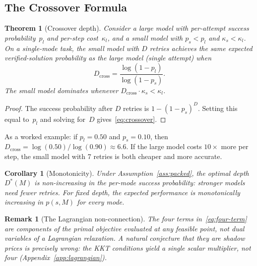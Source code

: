 \documentclass[11pt]{article}
\newtheorem{theorem}{Theorem}
\newtheorem{proof}{Proof}
\newtheorem{corollary}{Corollary}
\newtheorem{remark}{Remark}
\begin{document}
\subsection{The Crossover Formula}
\label{sec:crossover}

\begin{theorem}[Crossover depth]
\label{thm:crossover}
Consider a large model with per-attempt success probability~$p_l$ and
per-step cost~$\kappa_l$, and a small model with $p_s < p_l$ and
$\kappa_s < \kappa_l$.
On a single-mode task, the small model with $D$ retries achieves the
same expected verified-solution probability as the large model (single
attempt) when
\begin{equation}
\label{eq:crossover}
  D_{\mathrm{cross}} = \frac{\log(1 - p_l)}{\log(1 - p_s)}.
\end{equation}
The small model dominates whenever $D_{\mathrm{cross}} \cdot \kappa_s < \kappa_l$.
\end{theorem}

\begin{proof}
The success probability after $D$ retries is $1 - (1-p_s)^D$.
Setting this equal to~$p_l$ and solving for~$D$ gives~\eqref{eq:crossover}.
\end{proof}

As a worked example: if $p_l = 0.50$ and $p_s = 0.10$, then
$D_{\mathrm{cross}} = \log(0.50)/\log(0.90) \approx 6.6$.
If the large model costs $10\times$ more per step, the small model
with 7 retries is both cheaper and more accurate.

\begin{corollary}[Monotonicity]
\label{cor:monotonicity}
Under Assumption~\ref{ass:packed}, the optimal depth $D^*(M)$ is
non-increasing in the per-mode success probability: stronger models need
fewer retries.  For fixed depth, the expected performance is monotonically
increasing in $p(s,M)$ for every mode.
\end{corollary}

\begin{remark}[The Lagrangian non-connection]
\label{rem:lagrangian}
The four terms in~\eqref{eq:four-term} are components of the primal
objective evaluated at any feasible point, not dual variables of a
Lagrangian relaxation.  A natural conjecture that they are shadow prices
is precisely wrong: the KKT conditions yield a single scalar multiplier,
not four (Appendix~\ref{app:lagrangian}).
\end{remark}


\end{document}
